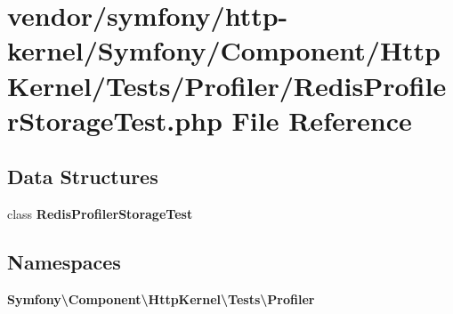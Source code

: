 \section{vendor/symfony/http-\/kernel/\+Symfony/\+Component/\+Http\+Kernel/\+Tests/\+Profiler/\+Redis\+Profiler\+Storage\+Test.php File Reference}
\label{_redis_profiler_storage_test_8php}
\subsection*{Data Structures}
\begin{DoxyCompactItemize}
\item 
class {\bf Redis\+Profiler\+Storage\+Test}
\end{DoxyCompactItemize}
\subsection*{Namespaces}
\begin{DoxyCompactItemize}
\item 
 {\bf Symfony\textbackslash{}\+Component\textbackslash{}\+Http\+Kernel\textbackslash{}\+Tests\textbackslash{}\+Profiler}
\end{DoxyCompactItemize}
